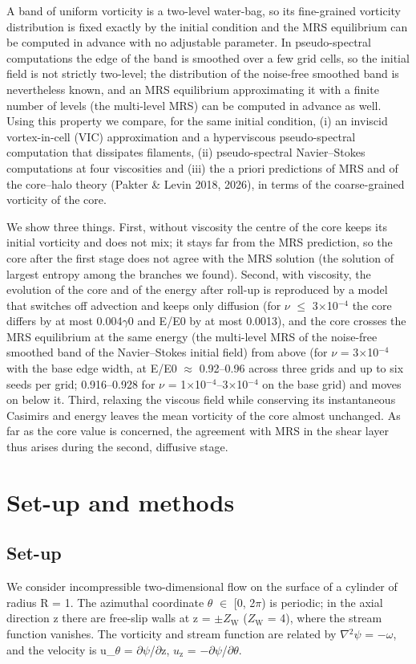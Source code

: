 \documentclass[11pt]{article}
\begin{document}
A band of uniform vorticity is a two-level water-bag, so its fine-grained vorticity distribution is fixed exactly by the initial condition and the MRS equilibrium can be computed in advance with no adjustable parameter. In pseudo-spectral computations the edge of the band is smoothed over a few grid cells, so the initial field is not strictly two-level; the distribution of the noise-free smoothed band is nevertheless known, and an MRS equilibrium approximating it with a finite number of levels (the multi-level MRS) can be computed in advance as well. Using this property we compare, for the same initial condition, (i) an inviscid vortex-in-cell (VIC) approximation and a hyperviscous pseudo-spectral computation that dissipates filaments, (ii) pseudo-spectral Navier--Stokes computations at four viscosities and (iii) the a priori predictions of MRS and of the core--halo theory (Pakter \& Levin 2018, 2026), in terms of the coarse-grained vorticity of the core.

We show three things. First, without viscosity the centre of the core keeps its initial vorticity and does not mix; it stays far from the MRS prediction, so the core after the first stage does not agree with the MRS solution (the solution of largest entropy among the branches we found). Second, with viscosity, the evolution of the core and of the energy after roll-up is reproduced by a model that switches off advection and keeps only diffusion (for $\nu{}$ $\le{}$ 3$\times{}$10$^{-4}$ the core differs by at most 0.004$\gamma{}$0 and E/E0 by at most 0.0013), and the core crosses the MRS equilibrium at the same energy (the multi-level MRS of the noise-free smoothed band of the Navier--Stokes initial field) from above (for $\nu{}$ = 3$\times{}$10$^{-4}$ with the base edge width, at E/E0 $\approx{}$ 0.92--0.96 across three grids and up to six seeds per grid; 0.916--0.928 for $\nu{}$ = 1$\times{}$10$^{-4}$--3$\times{}$10$^{-4}$ on the base grid) and moves on below it. Third, relaxing the viscous field while conserving its instantaneous Casimirs and energy leaves the mean vorticity of the core almost unchanged. As far as the core value is concerned, the agreement with MRS in the shear layer thus arises during the second, diffusive stage.

\section{Set-up and methods}

\subsection{Set-up}
We consider incompressible two-dimensional flow on the surface of a cylinder of radius R = 1. The azimuthal coordinate $\theta{}$ $\in{}$ [0, 2$\pi{}$) is periodic; in the axial direction z there are free-slip walls at z = $\pm{}Z_{\mathrm{W}}$ ($Z_{\mathrm{W}}$ = 4), where the stream function vanishes. The vorticity and stream function are related by $\nabla{}^{2}\psi{}$ = $-\omega{}$, and the velocity is u\_$\theta{}$ = $\partial{}\psi{}$/$\partial{}$z, $u_{\mathrm{z}}$ = $-\partial{}\psi{}$/$\partial{}\theta{}$.
\end{document}
